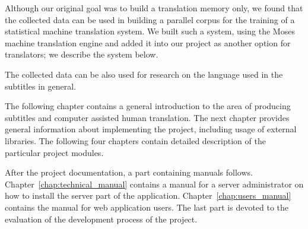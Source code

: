 Although our original goal was to build a translation memory only, we found that the collected data can be used in building a parallel corpus for the training of a statistical machine translation system. We built such a system, using the Moses machine translation engine and added it into our project as another option for translators; we describe the system below.

The collected data can be also used for research on the language used in the subtitles in general.

The following chapter contains a general introduction to the area of producing subtitles and computer assisted human translation. The next chapter provides general information about implementing the project, including usage of external libraries. The following four chapters contain detailed description of the particular project modules.

After the project documentation, a part containing manuals follows. Chapter~\ref{chap:technical_manual} contains a manual for a server administrator on how to install the server part of the application. Chapter~\ref{chap:users_manual} contains the manual for web application users. The last part is devoted to the evaluation of the development process of the project.